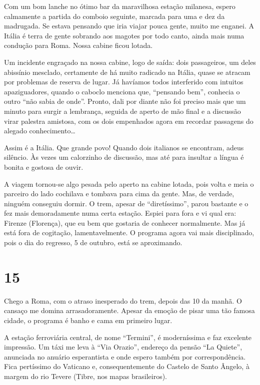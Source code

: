 Com um bom lanche no ótimo bar da maravilhosa estação milanesa, espero calmamente a partida do comboio seguinte, marcada para uma e dez da madrugada. Se estava pensando que iria viajar pouca gente, muito me enganei. A Itália é terra de gente sobrando aos magotes por todo canto, ainda mais numa condução para Roma. Nossa cabine ficou lotada.

Um incidente engraçado na nossa cabine, logo de saída: dois passageiros, um deles abissínio mesclado, certamente de há muito radicado na Itália, quase se atracam por problemas de reserva de lugar. Já havíamos todos interferido com intuitos apaziguadores, quando o caboclo menciona que, ``pensando bem'', conhecia o outro ``não sabia de onde''. Pronto, dali por diante não foi preciso mais que um minuto para surgir a lembrança, seguida de aperto de mão final e a discussão virar palestra amistosa, com os dois empenhados agora em recordar passagens do alegado conhecimento\ldots

Assim é a Itália. Que grande povo! Quando dois italianos se encontram, adeus silêncio. Às vezes um calorzinho de discussão, mas até para insultar a língua é bonita e gostosa de ouvir.

A viagem tornou-se algo pesada pelo aperto na cabine lotada, pois volta e meia o parceiro do lado cochilava e tombava para cima da gente. Mas, de verdade, ninguém conseguiu dormir. O trem, apesar de ``diretíssimo'', parou bastante e o fez mais demoradamente numa certa estação. Espiei para fora e vi qual era: Firenze (Florença), que eu bem que gostaria de conhecer normalmente. Mas já está fora de cogitação, lamentavelmente. O programa agora vai mais disciplinado, pois o dia do regresso, 5 de outubro, está se aproximando.

\section*{15 \adfflatleafright {}}
Chego a Roma, com o atraso inesperado do trem, depois das 10 da manhã. O cansaço me domina arrasadoramente. Apesar da emoção de pisar uma tão famosa cidade, o programa é banho e cama em primeiro lugar.

A estação ferroviária central, de nome ``Termini'', é moderníssima e faz excelente impressão. Um táxi me leva à ``Via Orazio'', endereço da pensão ``La Quiete'', anunciada no anuário esperantista e onde espero também por correspondência. Fica pertíssimo do Vaticano e, consequentemente do Castelo de Santo Ângelo, à margem do rio Tevere (Tibre, nos mapas brasileiros).

